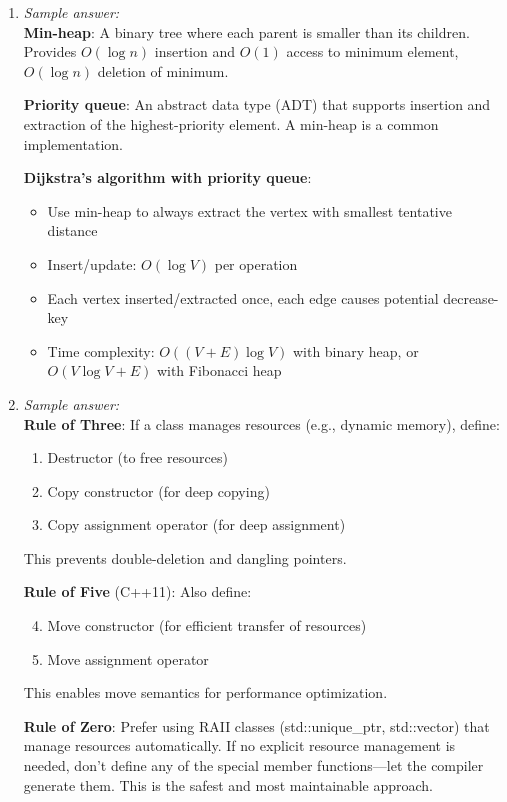 \documentclass[11pt]{article}
\begin{document}
\begin{enumerate}[label=\textbf{\arabic*.}]
  The occasional expensive resize is ``amortized'' over many cheap insertions, yielding constant 
  average time.

  \item \emph{Sample answer:}\\
  \textbf{Min-heap}: A binary tree where each parent is smaller than its children. Provides $O(\log n)$ 
  insertion and $O(1)$ access to minimum element, $O(\log n)$ deletion of minimum.

  \textbf{Priority queue}: An abstract data type (ADT) that supports insertion and extraction of 
  the highest-priority element. A min-heap is a common implementation.

  \textbf{Dijkstra's algorithm with priority queue}:
  \begin{itemize}
    \item Use min-heap to always extract the vertex with smallest tentative distance
    \item Insert/update: $O(\log V)$ per operation
    \item Each vertex inserted/extracted once, each edge causes potential decrease-key
    \item Time complexity: $O((V + E) \log V)$ with binary heap, or $O(V \log V + E)$ with Fibonacci heap
  \end{itemize}

  \item \emph{Sample answer:}\\
  \textbf{Rule of Three}: If a class manages resources (e.g., dynamic memory), define:
  \begin{enumerate}
    \item Destructor (to free resources)
    \item Copy constructor (for deep copying)
    \item Copy assignment operator (for deep assignment)
  \end{enumerate}
  This prevents double-deletion and dangling pointers.

  \textbf{Rule of Five} (C++11): Also define:
  \begin{enumerate}
    \setcounter{enumi}{3}
    \item Move constructor (for efficient transfer of resources)
    \item Move assignment operator
  \end{enumerate}
  This enables move semantics for performance optimization.

  \textbf{Rule of Zero}: Prefer using RAII classes (std::unique\_ptr, std::vector) that manage 
  resources automatically. If no explicit resource management is needed, don't define any of the 
  special member functions—let the compiler generate them. This is the safest and most maintainable 
  approach.


\end{enumerate}
\end{document}
